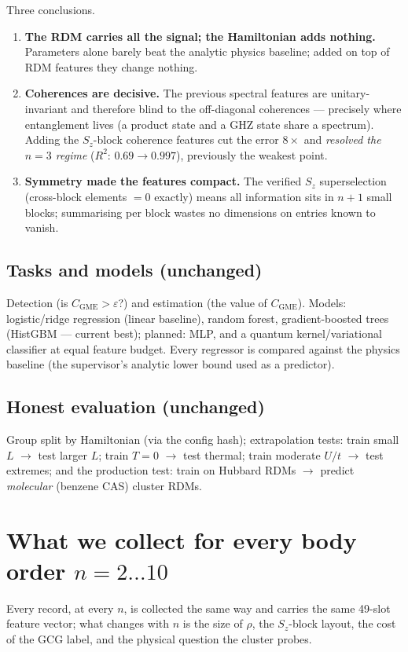 \documentclass[11pt]{article}
\newcommand{\CGME}{\ensuremath{C_{\mathrm{GME}}}}
\begin{document}
Three conclusions.
\begin{enumerate}[nosep]
  \item \textbf{The RDM carries all the signal; the Hamiltonian adds
        nothing.} Parameters alone barely beat the analytic physics baseline;
        added on top of RDM features they change nothing.
  \item \textbf{Coherences are decisive.} The previous spectral features are
        unitary-invariant and therefore blind to the off-diagonal coherences
        --- precisely where entanglement lives (a product state and a GHZ
        state share a spectrum). Adding the $S_z$-block coherence features
        cut the error $8\times$ and \emph{resolved the $n=3$ regime}
        ($R^2$: $0.69\to0.997$), previously the weakest point.
  \item \textbf{Symmetry made the features compact.} The verified $S_z$
        superselection (cross-block elements $=0$ exactly) means all
        information sits in $n{+}1$ small blocks; summarising per block wastes
        no dimensions on entries known to vanish.
\end{enumerate}

\subsection{Tasks and models (unchanged)}
Detection (is $\CGME>\varepsilon$?) and estimation (the value of \CGME).
Models: logistic/ridge regression (linear baseline), random forest,
gradient-boosted trees (HistGBM --- current best); planned: MLP, and a
quantum kernel/variational classifier at equal feature budget. Every
regressor is compared against the physics baseline (the supervisor's analytic
lower bound used as a predictor).

\subsection{Honest evaluation (unchanged)}
Group split by Hamiltonian (via the config hash); extrapolation tests: train
small $L$ $\to$ test larger $L$; train $T{=}0$ $\to$ test thermal; train
moderate $U/t$ $\to$ test extremes; and the production test: train on Hubbard
RDMs $\to$ predict \emph{molecular} (benzene CAS) cluster RDMs.

\section{What we collect for every body order $n=2\ldots10$}\label{sec:pern}
Every record, at every $n$, is collected the same way and carries the same
49-slot feature vector; what changes with $n$ is the size of $\rho$, the
$S_z$-block layout, the cost of the GCG label, and the physical question the
cluster probes.
\end{document}
